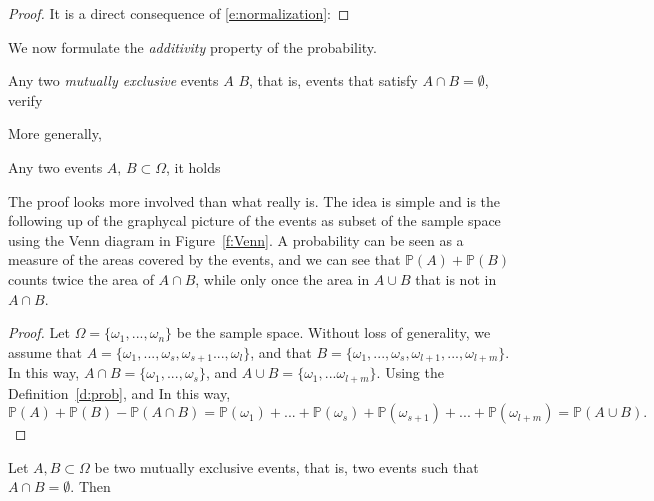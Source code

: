 	\begin{proof}
		It is a direct consequence of \eqref{e:normalization}:

	\end{proof}
	We now formulate the \emph{additivity} property of the probability. 
	\begin{proposition}[Additivity]
		\label{p:monotone}
		Any two \emph{mutually exclusive} events $A$ $B$, that is, events that satisfy  $A\cap B=\emptyset$, verify
	\end{proposition}
		More generally, 
	\begin{proposition}
		\label{p:exclusive}
		Any two events $A,\, B\subset \Omega$, it holds  
	\end{proposition}
	 The proof looks more involved than what really is. The idea is simple and is the following up of the graphycal picture of the events as subset of the sample space using the Venn diagram in Figure~\ref{f:Venn}. A probability can be seen as a measure of the areas covered by the events, and we can see that $\mathbb P(A)  + \mathbb P(B)$ counts twice the area of $A \cap B$, while only once the area in $A \cup B$ that is not in $A \cap B$.  
	\begin{proof}
	Let $\Omega=\{\omega_1,...,\omega_n\}$ be the sample space. Without loss of generality, we assume that $A=\{\omega_1,...,\omega_s,\omega_{s+1}...,\omega_l\}$, and that $B=\{\omega_1,...,\omega_s,\omega_{l+1},...,\omega_{l+m}\}$. In this way, $A\cap B=\{\omega_1,...,\omega_s\}$, and $A\cup B=\{\omega_1,...\omega_{l+m}\}$. Using the Definition~\ref{d:prob}, 
	and 
	In this way, $$\mathbb{P}(A)+\mathbb{P}(B)-\mathbb{P}(A\cap B)=\mathbb{P}(\omega_1)+...+\mathbb{P}(\omega_s)+\mathbb{P}(\omega_{s+1})+...+\mathbb{P}(\omega_{l+m})=\mathbb{P}(A\cup B).$$
	\end{proof}
	\begin{corollary}\label{}
		Let $A,B\subset\Omega$ be two mutually exclusive events, that is, two events such that $A\cap B = \emptyset$. Then 
	\end{corollary}
